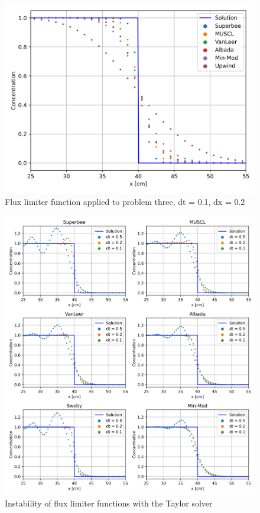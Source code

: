 \clearpage

\begin{figure}[p]
    \centering
    \includegraphics[width=5in]{images/chapter-5/problem3FluxLimiters.png}
    \caption{Flux limiter function applied to problem three, dt = 0.1, dx = 0.2}
    \label{fig:fluxlimiters_problem3}
\end{figure}

\clearpage

\begin{figure}[p]
    \centering
    \includegraphics[width=6in]{images/chapter-5/problem3SecondOrderFluxLimiterFunctionInstability.png}
    \caption{Instability of flux limiter functions with the Taylor solver}
    \label{fig:fluxlimiters_instability_problem3}
\end{figure}

